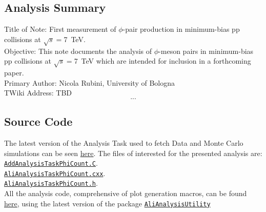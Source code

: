 \subsection{Analysis Summary}
Title of Note: First measurement of $\phi$-pair production in minimum-bias pp collisions at $\sqrt{s}=$\SI{7}{\tera\electronvolt}.\\
Objective: This note documents the analysis of $\phi$-meson pairs in minimum-bias pp collisions at $\sqrt{s}=$\SI{7}{\tera\electronvolt} which are intended for inclusion in a forthcoming paper.\\
Primary Author: Nicola Rubini, University of Bologna\\
TWiki Address: TBD
\[...\]
\begin{comment}
This section is a list of information required by the Physics Board.
Title of Note: Measurement of φ Mesons in Minimum-Bias pp Collisions at s = 13 TeV
Objective: This note documents the analysis of φ mesons in minimum-bias pp collisions at which are intended for inclusion in a forthcoming paper.
Primary Author: Anders G. Knospe, The University of Houston
TWiki Address: https://twiki.cern.ch/twiki/bin/view/ALICE/PWGLFResonancesPhiPP13TeV
s = 13 TeV,
AliRoot/AliPhysics versions: AliRoot::v5-08-09-1 + AliPhysics::vAN-20160502-1
Data Samples Used: real data: LHC15f, ESDs, pass 2
Analysis General and Specific Selections: Standard Physics Selection, |vz| < 10 cm, pileup rejection Detectors: ITS, TPC, TOF
Description of cuts: standard ITS/TPC track cuts for 2011, see Section 4.1.
Simulations: LHC15g3a3, LHC15g3c3, and LHC16d3; ESDs
Discussion of Efficiencies, Corrections, Etc.: see Section 7.1
Normalization: see Section 7.4
Discussion of Uncertainties: see Sections 8, 9.2, and 9.3.
Relevant Presentations:
\end{comment}
\subsection{Source Code}
The latest version of the Analysis Task used to fetch Data and Monte Carlo simulations can be seen \href{https://github.com/alisw/AliPhysics/tree/master/PWGLF/RESONANCES/extra}{here}. The files of interested for the presented analysis are:\\
\href{https://github.com/alisw/AliPhysics/blob/master/PWGLF/RESONANCES/extra/AddAnalysisTaskPhiCount.C}{\texttt{AddAnalysisTaskPhiCount.C}}.\\
\href{https://github.com/alisw/AliPhysics/blob/master/PWGLF/RESONANCES/extra/AliAnalysisTaskPhiCount.cxx}{\texttt{AliAnalysisTaskPhiCount.cxx}}.\\
\href{https://github.com/alisw/AliPhysics/blob/master/PWGLF/RESONANCES/extra/AliAnalysisTaskPhiCount.h}{\texttt{AliAnalysisTaskPhiCount.h}}.\\
\indent All the analysis code, comprehensive of plot generation macros, can be found \href{https://github.com/Nikolajal/AliAnalysisPhiCount}{here}, using the latest version of the package \href{https://github.com/Nikolajal/AliAnalysisUtility.git}{\texttt{AliAnalysisUtility}}